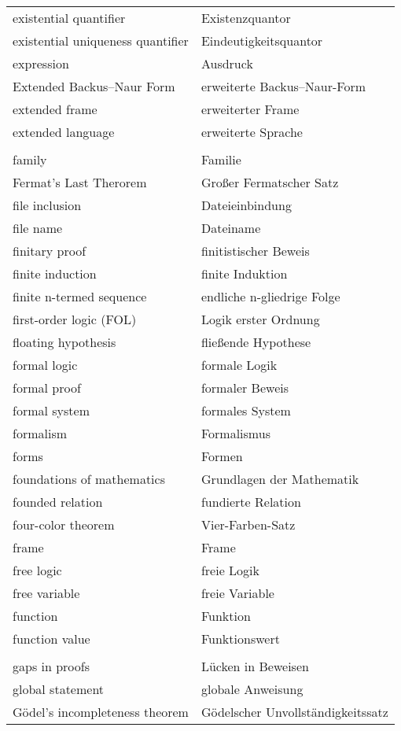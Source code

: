 \begin{longtabu}   { @{} X[l] X[l] }
    existential quantifier & Existenzquantor \\
    existential uniqueness quantifier & Eindeutigkeitsquantor \\
    expression & Ausdruck \\
    Extended Backus--Naur Form & erweiterte Backus--Naur-Form \\
    extended frame & erweiterter Frame \\
    extended language & erweiterte Sprache \\
     & \\
    family & Familie \\
    Fermat's Last Therorem & Großer Fermatscher Satz \\
    file inclusion & Dateieinbindung \\
    file name & Dateiname \\
    finitary proof & finitistischer Beweis \\
    finite induction & finite Induktion \\
    finite n-termed sequence & endliche n-gliedrige Folge \\
    first-order logic (FOL) & Logik erster Ordnung \\
    floating hypothesis & fließende Hypothese \\
    formal logic & formale Logik \\
    formal proof & formaler Beweis \\
    formal system & formales System \\
    formalism & Formalismus \\
    forms & Formen \\
    foundations of mathematics & Grundlagen der Mathematik \\
    founded relation & fundierte Relation \\
    four-color theorem & Vier-Farben-Satz \\
    frame & Frame \\
    free logic & freie Logik \\
    free variable & freie Variable \\
    function & Funktion \\
    function value & Funktionswert \\
     & \\
    gaps in proofs & Lücken in Beweisen \\
    global statement & globale Anweisung \\
    Gödel's incompleteness theorem &  Gödelscher Unvollständigkeitssatz \\

\end{longtabu}
